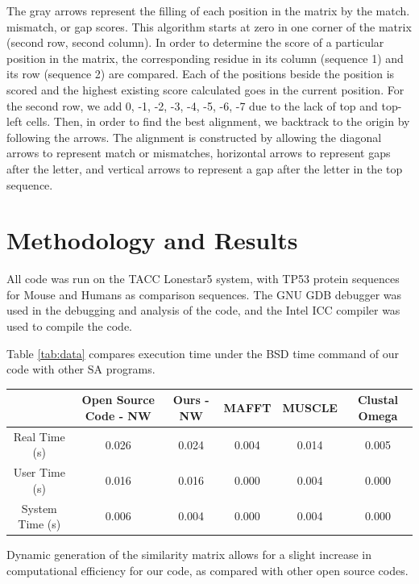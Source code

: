 \documentclass{article}
\begin{document}
The gray arrows represent the filling of each position in the matrix by the
match. mismatch, or gap scores. This algorithm starts at zero in one corner of
the matrix (second row, second column). In order to determine the score of a
particular position in the matrix, the corresponding residue in its column
(sequence 1) and its row (sequence 2) are compared. Each of the positions beside
the position is scored and the highest existing score calculated goes in the
current position. For the second row, we add 0, -1, -2, -3, -4, -5, -6, -7 due
to the lack of top and top-left cells. Then, in order to find the best
alignment, we backtrack to the origin by following the arrows. The alignment is
constructed by allowing the diagonal arrows to represent match or mismatches,
horizontal arrows to represent gaps after the letter, and vertical arrows to
represent a gap after the letter in the top sequence. \cite{nw}

\section*{Methodology and Results} 

All code was run on the TACC Lonestar5 system, with TP53 protein sequences for
Mouse and Humans as comparison sequences.  
The GNU GDB debugger was used in the debugging and analysis of the code, and 
the Intel ICC compiler was used to compile the code.

Table \ref{tab:data} compares execution time under the BSD time command of our
code with other SA programs.

\begin{center}
    \begin{tabular}{c|c|c|c|c|c}
        & Open Source Code - NW & Ours - NW & MAFFT & MUSCLE & Clustal Omega \\
        \hline
        Real Time (s) & 0.026 & 0.024 & 0.004 & 0.014 & 0.005 \\
        User Time (s) & 0.016 & 0.016 & 0.000 & 0.004 & 0.000 \\
        System Time (s) & 0.006 & 0.004 & 0.000 & 0.004 & 0.000 \\
    \end{tabular}
    \label{tab:data}
\end{center}

Dynamic generation of the similarity matrix allows for a slight increase in
computational efficiency for our code, as compared with other open source codes.
\end{document}
